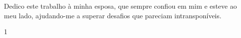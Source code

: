 \maketitle

\begin{itadedication}
Dedico este trabalho à minha esposa, que sempre confiou em mim e esteve ao meu lado, ajudando-me a superar desafios que pareciam intransponíveis.
\end{itadedication}


\begin{itathanks}

\end{itathanks}

\ifhyperref{}\fi
\begin{flushright}
\begin{spacing}{1}
\mbox{}\vfill

\end{spacing}
\end{flushright}

\begin{abstract}
\noindent

\end{abstract}

\begin{englishabstract}
\noindent

\end{englishabstract}

\listoffigures %

\listoftables %

\printnoidxglossary[type=\acronymtype,
    title=\listofabbreviationsname,
    sort=standard,
    nonumberlist]
    
\printnoidxglossary[
    title=\listofsymbolsname,
    sort=use,   %
    nonumberlist]
\tableofcontents
